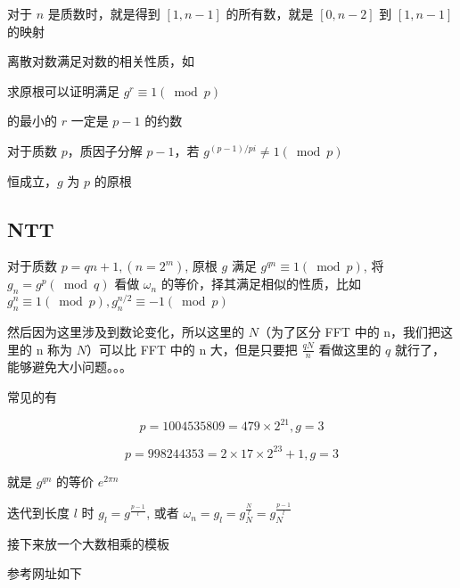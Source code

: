 对于 $n$ 是质数时，就是得到 $[1,n−1]$ 的所有数，就是 $[0,n−2]$ 到 $[1,n−1]$ 的映射

离散对数满足对数的相关性质，如

求原根可以证明满足 $g^r \equiv 1(\bmod p)$

​的最小的 $r$ 一定是 $p−1$ 的约数

对于质数 $p$，质因子分解 $p−1$，若 $g^{(p-1)/pi} \neq 1 (\bmod p)$

​恒成立，$g$ 为 $p$ 的原根

\subsection{NTT}

对于质数 $p=qn+1, (n=2^m)$ ​, 原根 $g$ 满足 $g^{qn} \equiv 1 (\bmod p)$​, 将 $g_n=g^p(\bmod q)$ 看做 $\omega_n$ 的等价，择其满足相似的性质，比如 $g_n^n \equiv 1 (\bmod p), g_n^{n/2} \equiv -1 (\bmod p)$

然后因为这里涉及到数论变化，所以这里的 $N$（为了区分 FFT 中的 n，我们把这里的 n 称为 $N$）可以比 FFT 中的 n 大，但是只要把 $\frac{qN}{n}$ 看做这里的 $q$ 就行了，能够避免大小问题。。。

常见的有

$$
p = 1004535809 = 479 \times 2^{21}, g=3
$$

$$
p=998244353=2 \times 17 \times 2^{23}+1, g=3
$$

就是 $g^{qn}$ 的等价 $e^{2\pi n}$

迭代到长度 $l$ 时 $g_l = g^{\frac{p-1}{l}}$, 或者 $\omega_n = g_l = g_N^{\frac{N}{l}} = g_N^{\frac{p-1}{l}}$

接下来放一个大数相乘的模板

参考网址如下 \href{https://blog.csdn.net/blackjack_/article/details/79346433}{}

